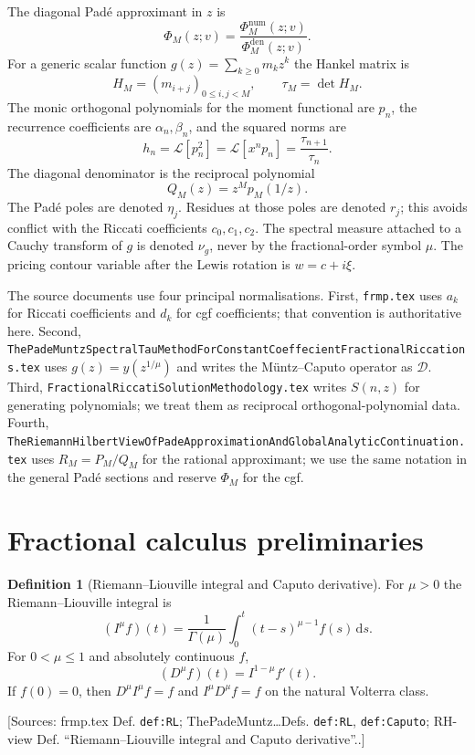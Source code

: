 \documentclass[11pt]{article}
\theoremstyle{definition}
\newtheorem{definition}[theorem]{Definition}
\newcommand{\dd}{\,\mathrm{d}}
\newcommand{\Lc}{\mathcal{L}}
\newcommand{\Dc}{\mathcal{D}}
\newcommand{\Source}[1]{\par\smallskip\noindent\textup{[Sources: #1.]}}
\begin{document}
The diagonal Padé approximant in $z$ is
\begin{equation}\label{eq:pade-symbol}
        \Phi_M(z;v)=\frac{\Phi^{\mathrm{num}}_M(z;v)}{\Phi^{\mathrm{den}}_M(z;v)}.
\end{equation}
For a generic scalar function $g(z)=\sum_{k\ge0}m_kz^k$ the Hankel matrix is
\[
        H_M=(m_{i+j})_{0\le i,j<M},
        \qquad \tau_M=\det H_M.
\]
The monic orthogonal polynomials for the moment functional are $p_n$,
the recurrence coefficients are $\alpha_n,\beta_n$,
and the squared norms are
\[
        h_n=\Lc[p_n^2]=\Lc[x^np_n]=\frac{\tau_{n+1}}{\tau_n}.
\]
The diagonal denominator is the reciprocal polynomial
\[
        Q_M(z)=z^M p_M(1/z).
\]
The Padé poles are denoted $\eta_j$.
Residues at those poles are denoted $r_j$;
this avoids conflict with the Riccati coefficients $c_0,c_1,c_2$.
The spectral measure attached to a Cauchy transform of $g$ is denoted $\nu_g$,
never by the fractional-order symbol $\mu$.
The pricing contour variable after the Lewis rotation is $w=c+i\xi$.

The source documents use four principal normalisations.
First,
\texttt{frmp.tex} uses $a_k$ for Riccati coefficients and $d_k$ for cgf coefficients;
that convention is authoritative here.
Second,
\texttt{ThePadeMuntzSpectralTauMethodForConstantCoeffecientFractionalRiccations.tex}
uses $g(z)=y(z^{1/\mu})$ and writes the Müntz--Caputo operator as $\Dc$.
Third,
\texttt{FractionalRiccatiSolutionMethodology.tex} writes $S(n,z)$ for generating polynomials;
we treat them as reciprocal orthogonal-polynomial data.
Fourth,
\texttt{TheRiemannHilbertViewOfPadeApproximationAndGlobalAnalyticContinuation.tex}
uses $R_M=P_M/Q_M$ for the rational approximant;
we use the same notation in the general Padé sections and reserve $\Phi_M$ for the cgf.

\section{Fractional calculus preliminaries}

\begin{definition}[Riemann--Liouville integral and Caputo derivative]\label{def:frac-ops}
For $\mu>0$ the Riemann--Liouville integral is
\begin{equation}\label{eq:rl-integral}
        (I^{\mu}f)(t)=\frac1{\Gamma(\mu)}\int_0^t (t-s)^{\mu-1}f(s)\dd s.
\end{equation}
For $0<\mu\le1$ and absolutely continuous $f$,
\begin{equation}\label{eq:caputo}
        (D^{\mu}f)(t)=I^{1-\mu}f'(t).
\end{equation}
If $f(0)=0$, then $D^{\mu}I^{\mu}f=f$ and $I^{\mu}D^{\mu}f=f$ on the natural Volterra class.
\Source{frmp.tex Def. \texttt{def:RL}; ThePadeMuntz\ldots Defs. \texttt{def:RL}, \texttt{def:Caputo}; RH-view Def. ``Riemann--Liouville integral and Caputo derivative''.}
\end{definition}
\end{document}

